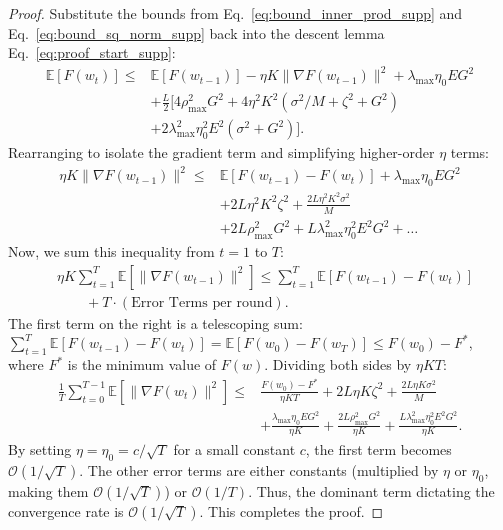 \documentclass[11pt]{article}
\begin{document}
\begin{proof}
Substitute the bounds from Eq.~\eqref{eq:bound_inner_prod_supp} and Eq.~\eqref{eq:bound_sq_norm_supp} back into the descent lemma Eq.~\eqref{eq:proof_start_supp}:
\begin{align}
    \mathbb{E}[F(w_t)] \le & \mathbb{E}[F(w_{t-1})] - \eta K \|\nabla F(w_{t-1})\|^2 + \lambda_{\max}\eta_0 E G^2 \nonumber \\
    & + \frac{L}{2} [4\rho_{\max}^2 G^2 + 4\eta^2 K^2 (\sigma^2/M + \zeta^2 + G^2) \nonumber \\
    & + 2\lambda_{\max}^2 \eta_0^2 E^2 (\sigma^2 + G^2)].
\end{align}
Rearranging to isolate the gradient term and simplifying higher-order $\eta$ terms:
\begin{align}
    \eta K \|\nabla F(w_{t-1})\|^2 \le & \mathbb{E}[F(w_{t-1}) - F(w_t)] + \lambda_{\max}\eta_0 E G^2 \nonumber \\
    & + 2L\eta^2 K^2 \zeta^2 + \frac{2L\eta^2 K^2 \sigma^2}{M} \nonumber \\
    & + 2L\rho_{\max}^2 G^2 + L\lambda_{\max}^2 \eta_0^2 E^2 G^2 + \dots
\end{align}
Now, we sum this inequality from $t=1$ to $T$:
\begin{align}
    &\eta K \sum_{t=1}^T \mathbb{E}[\|\nabla F(w_{t-1})\|^2] \le \sum_{t=1}^T \mathbb{E}[F(w_{t-1}) - F(w_t)] \nonumber \\
    & \qquad + T \cdot (\text{Error Terms per round}).
\end{align}
The first term on the right is a telescoping sum: $\sum_{t=1}^T \mathbb{E}[F(w_{t-1}) - F(w_t)] = \mathbb{E}[F(w_0) - F(w_T)] \le F(w_0) - F^*$, where $F^*$ is the minimum value of $F(w)$.
Dividing both sides by $\eta K T$:
\begin{align}
    \frac{1}{T}\sum_{t=0}^{T-1} \mathbb{E}[\|\nabla F(w_t)\|^2] \le & \frac{F(w_0) - F^*}{\eta K T} + 2L\eta K \zeta^2 + \frac{2L\eta K \sigma^2}{M} \nonumber \\
    & + \frac{\lambda_{\max}\eta_0 E G^2}{\eta K} + \frac{2L\rho_{\max}^2 G^2}{\eta K} + \frac{L\lambda_{\max}^2 \eta_0^2 E^2 G^2}{\eta K}.
\end{align}
By setting $\eta = \eta_0 = c/\sqrt{T}$ for a small constant $c$, the first term becomes $\mathcal{O}(1/\sqrt{T})$. The other error terms are either constants (multiplied by $\eta$ or $\eta_0$, making them $\mathcal{O}(1/\sqrt{T})$) or $\mathcal{O}(1/T)$. Thus, the dominant term dictating the convergence rate is $\mathcal{O}(1/\sqrt{T})$.
This completes the proof.
\end{proof}
\end{document}
